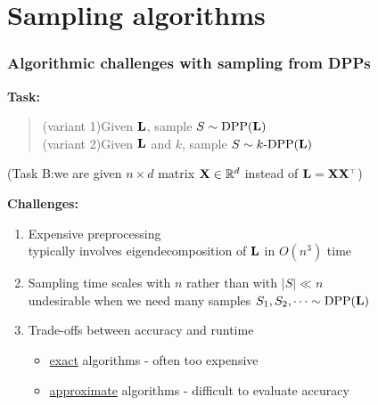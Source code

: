 \documentclass[handout]{beamer}
\begin{document}
\section{Sampling algorithms}

\begin{frame}
  \frametitle{Algorithmic challenges with sampling from DPPs}
  \textbf{Task:}
  \begin{quote}
(variant 1)\quad Given $\mathbf{L}$, sample $S\sim{\mathrm{DPP}}(\mathbf{L})$\\
(variant 2)\quad Given $\mathbf{L}$ and $k$, sample $S\sim
  k\text{-}{\mathrm{DPP}}(\mathbf{L})$
  \end{quote}
\pause 
(Task B:\quad we are given $n\times d$ matrix $\mathbf X\in\mathbb R^d$ instead of $\L=\X\X^\top$) 
\pause  \vspace{4mm}

  \textbf{Challenges:}
  \begin{enumerate}
  \item Expensive preprocessing \\[-1mm]
{\small typically involves eigendecomposition
  of $\mathbf{L}$ in $O(n^3)$ time}\pause
\vspace{2mm}
\item Sampling time scales with $n$ rather than with $|S|\ll n$\\[-1mm]
{\small undesirable when we need many samples
  $S_1,S_2,\dots\sim{\mathrm{DPP}}(\mathbf{L})$}\pause
\vspace{2mm}
\item Trade-offs between accuracy and runtime\\[-1mm]
  {\small   \begin{itemize}
\item \underline{exact} algorithms -  often too expensive
\item  \underline{approximate} algorithms - difficult to evaluate accuracy
\end{itemize} }
\end{enumerate}
\end{frame}
\end{document}
